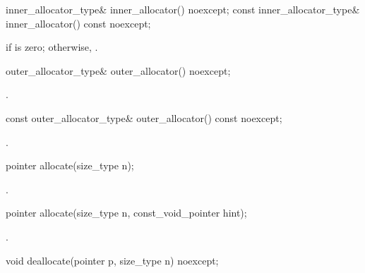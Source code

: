 %
\begin{itemdecl}
inner_allocator_type& inner_allocator() noexcept;
const inner_allocator_type& inner_allocator() const noexcept;
\end{itemdecl}

\begin{itemdescr}
\pnum
\returns {} if  is zero; otherwise,
.
\end{itemdescr}

%
\begin{itemdecl}
outer_allocator_type& outer_allocator() noexcept;
\end{itemdecl}

\begin{itemdescr}
\pnum
\returns {}.
\end{itemdescr}

%
\begin{itemdecl}
const outer_allocator_type& outer_allocator() const noexcept;
\end{itemdecl}

\begin{itemdescr}
\pnum
\returns {}.
\end{itemdescr}

%
\begin{itemdecl}
pointer allocate(size_type n);
\end{itemdecl}

\begin{itemdescr}
\pnum
\returns {}.
\end{itemdescr}

%
\begin{itemdecl}
pointer allocate(size_type n, const_void_pointer hint);
\end{itemdecl}

\begin{itemdescr}
\pnum
\returns {}.
\end{itemdescr}

%
\begin{itemdecl}
void deallocate(pointer p, size_type n) noexcept;
\end{itemdecl}

